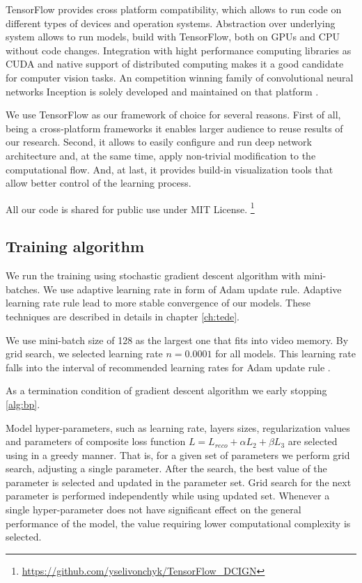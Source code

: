 TensorFlow provides cross platform compatibility, which allows to run code on different types of devices and operation systems.
Abstraction over underlying system allows to run models, build with TensorFlow, both on GPUs and CPU without code changes.
Integration with hight performance computing libraries as CUDA \cite{Nickolls2008} and native support of distributed computing makes it a good candidate for computer vision tasks.
An competition winning family of convolutional neural networks Inception is solely developed and maintained on that platform \cite{Szegedy2016}.

We use TensorFlow as our framework of choice for several reasons.
First of all, being a cross-platform frameworks it enables larger audience to reuse results of our research.
Second, it allows to easily configure and run deep network architecture and, at the same time, apply non-trivial modification to the computational flow.
And, at last, it provides build-in visualization tools that allow better control of the learning process.

All our code is shared for public use under MIT License.
\footnote{\url{https://github.com/yselivonchyk/TensorFlow_DCIGN}}

\subsection{Training algorithm}

We run the training using stochastic gradient descent algorithm with mini-batches.
We use adaptive learning rate in form of Adam update rule.
Adaptive learning rate rule lead to more stable convergence of our models.
These techniques are described in details in chapter \ref{ch:tede}.

We use mini-batch size of 128 as the largest one that fits into video memory.
By grid search, we selected learning rate $n=0.0001$ for all models. This learning rate falls into the interval of recommended learning rates for Adam update rule \cite{Kingma2015}.

As a termination condition of gradient descent algorithm we early stopping \ref{alg:bp}.

Model hyper-parameters, such as learning rate, layers sizes, regularization values and parameters of composite loss function $L=L_{reco} + \alpha L_2 + \beta L_3$ are selected using in a greedy manner.
That is, for a given set of parameters we perform grid search, adjusting a single parameter.
After the search, the best value of the parameter is selected and updated in the parameter set.
Grid search for the next parameter is performed independently while using updated set.
Whenever a single hyper-parameter does not have significant effect on the general performance of the model, the value requiring lower computational complexity is selected.

